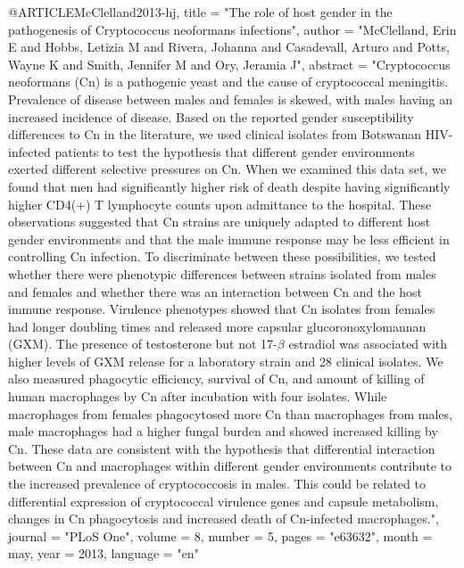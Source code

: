 @ARTICLE{McClelland2013-hj,
  title    = "The role of host gender in the pathogenesis of Cryptococcus
              neoformans infections",
  author   = "McClelland, Erin E and Hobbs, Letizia M and Rivera, Johanna and
              Casadevall, Arturo and Potts, Wayne K and Smith, Jennifer M and
              Ory, Jeramia J",
  abstract = "Cryptococcus neoformans (Cn) is a pathogenic yeast and the cause
              of cryptococcal meningitis. Prevalence of disease between males
              and females is skewed, with males having an increased incidence
              of disease. Based on the reported gender susceptibility
              differences to Cn in the literature, we used clinical isolates
              from Botswanan HIV-infected patients to test the hypothesis that
              different gender environments exerted different selective
              pressures on Cn. When we examined this data set, we found that
              men had significantly higher risk of death despite having
              significantly higher CD4(+) T lymphocyte counts upon admittance
              to the hospital. These observations suggested that Cn strains are
              uniquely adapted to different host gender environments and that
              the male immune response may be less efficient in controlling Cn
              infection. To discriminate between these possibilities, we tested
              whether there were phenotypic differences between strains
              isolated from males and females and whether there was an
              interaction between Cn and the host immune response. Virulence
              phenotypes showed that Cn isolates from females had longer
              doubling times and released more capsular glucoronoxylomannan
              (GXM). The presence of testosterone but not 17-$\beta$ estradiol
              was associated with higher levels of GXM release for a laboratory
              strain and 28 clinical isolates. We also measured phagocytic
              efficiency, survival of Cn, and amount of killing of human
              macrophages by Cn after incubation with four isolates. While
              macrophages from females phagocytosed more Cn than macrophages
              from males, male macrophages had a higher fungal burden and
              showed increased killing by Cn. These data are consistent with
              the hypothesis that differential interaction between Cn and
              macrophages within different gender environments contribute to
              the increased prevalence of cryptococcosis in males. This could
              be related to differential expression of cryptococcal virulence
              genes and capsule metabolism, changes in Cn phagocytosis and
              increased death of Cn-infected macrophages.",
  journal  = "PLoS One",
  volume   =  8,
  number   =  5,
  pages    = "e63632",
  month    =  may,
  year     =  2013,
  language = "en"
}

